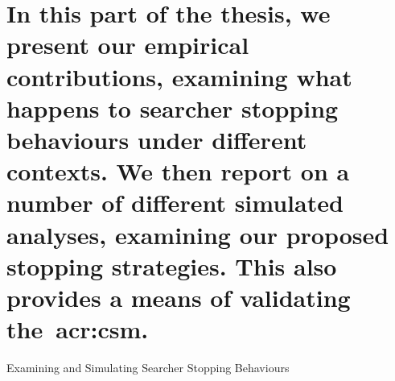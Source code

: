 
\part[Examining Searcher Stopping Behaviours]{In this part of the thesis, we present our empirical contributions, examining what happens to searcher stopping behaviours under different contexts. We then report on a number of different simulated analyses, examining our proposed stopping strategies. This also provides a means of validating the~\gls{acr:csm}.}{Examining and Simulating Searcher Stopping Behaviours}\label{part:context}